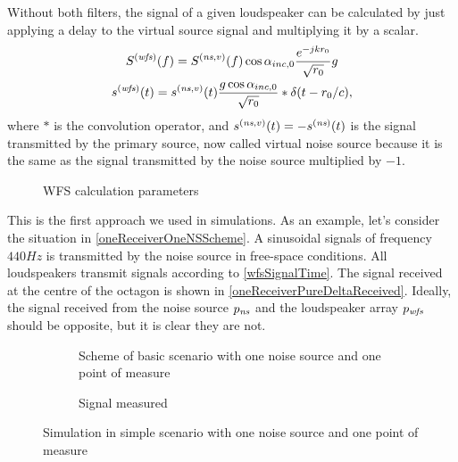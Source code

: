 Without both filters, the signal of a given loudspeaker can be calculated by just applying a delay to the virtual source signal and multiplying it by a scalar.
\begin{gather}
\signal[wfs][frequency](f) = \signal[nsVirt][frequency](f) \cos\normPrimaryPropAngleSection \frac{e^{-jk\distLinePrimSource}}{\sqrt{\distLinePrimSource}} g
\\
\signal[wfs][time](t) = \signal[nsVirt][time](t) \frac{g \cos\normPrimaryPropAngleSection}{\sqrt{\distLinePrimSource}}
\ast\delta(t - \distLinePrimSource/c),
\label{wfsSignalTime}
\end{gather}
where $\ast$ is the convolution operator, and $\signal[nsVirt][time](t) = -\signal[ns][time](t)$ is the signal transmitted by the primary source, now called virtual noise source because it is the same as the signal transmitted by the noise source multiplied by $-1$.
\begin{figure}
	\centering
	\def\svgwidth{0.4\columnwidth}
	\graphicspath{{Img/}}
	
	\caption[WFS calculation parameters]{WFS calculation parameters}
	\label{figAngleCondition}
\end{figure}

This is the first approach we used in simulations. As an example, let's consider the situation in \autoref{oneReceiverOneNSScheme}. A sinusoidal signals of frequency $440 \si{Hz}$ is transmitted by the noise source in free-space conditions. All loudspeakers transmit signals according to \autoref{wfsSignalTime}. The signal received at the centre of the octagon is shown in \autoref{oneReceiverPureDeltaReceived}. Ideally, the signal received from the noise source $\Field[ns][time]$ and the loudspeaker array $\Field[wfs][time]$ should be opposite, but it is clear they are not.

\begin{figure}
	\centering
	\begin{subfigure}[c]{0.45\textwidth}
	\centering
	\caption[Scheme of basic scenario]{Scheme of basic scenario with one noise source and one point of measure}
	\label{oneReceiverOneNSScheme}
	\end{subfigure}
	\begin{subfigure}[c]{0.45\textwidth}
		\centering
		\def\svgwidth{1.2\columnwidth}
		\graphicspath{{Img/}}
			{\fontsize{5}{12}\selectfont
		
	}
		\caption{Signal measured}
		\label{oneReceiverPureDeltaReceived}
	\end{subfigure}
	\caption{Simulation in simple scenario with one noise source and one point of measure}
\end{figure}

